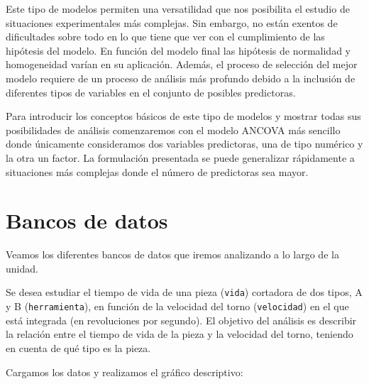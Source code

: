 \documentclass[
]{book}
\theoremstyle{definition}
\theoremstyle{definition}
\theoremstyle{definition}
\theoremstyle{remark}
\let\BeginKnitrBlock\begin \let\EndKnitrBlock\end
\begin{document}
Este tipo de modelos permiten una versatilidad que nos posibilita el estudio de situaciones experimentales más complejas. Sin embargo, no están exentos de dificultades sobre todo en lo que tiene que ver con el cumplimiento de las hipótesis del modelo. En función del modelo final las hipótesis de normalidad y homogeneidad varían en su aplicación. Además, el proceso de selección del mejor modelo requiere de un proceso de análisis más profundo debido a la inclusión de diferentes tipos de variables en el conjunto de posibles predictoras.

Para introducir los conceptos básicos de este tipo de modelos y mostrar todas sus posibilidades de análisis comenzaremos con el modelo ANCOVA más sencillo donde únicamente consideramos dos variables predictoras, una de tipo numérico y la otra un factor. La formulación presentada se puede generalizar rápidamente a situaciones más complejas donde el número de predictoras sea mayor.

\hypertarget{bancos-de-datos}{%
\section{Bancos de datos}\label{bancos-de-datos}}

Veamos los diferentes bancos de datos que iremos analizando a lo largo de la unidad.

\BeginKnitrBlock{example}[Tiempo de vida]
\protect\hypertarget{exm:acov01}{}{\label{exm:acov01} \iffalse (Tiempo de vida) \fi{} }Se desea estudiar el tiempo de vida de una pieza (\texttt{vida}) cortadora de dos tipos, A y B (\texttt{herramienta}), en función de la velocidad del torno (\texttt{velocidad}) en el que está integrada (en revoluciones por segundo). El objetivo del análisis es describir la relación entre el tiempo de vida de la pieza y la velocidad del torno, teniendo en cuenta de qué tipo es la pieza.
\EndKnitrBlock{example}

Cargamos los datos y realizamos el gráfico descriptivo:
\end{document}
